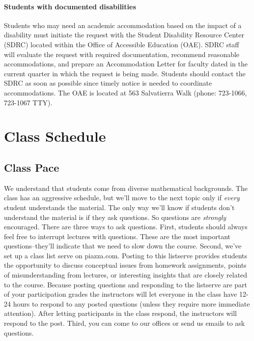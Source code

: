 \documentclass[11pt,letterpaper]{article}
\numberwithin{equation}{section}
\begin{document}
\paragraph{Students with documented disabilities} Students who may need an academic accommodation based on the impact of a disability must initiate the request with the Student Disability Resource Center (SDRC) located within the Office of Accessible Education (OAE). SDRC staff will evaluate the request with required documentation, recommend reasonable accommodations, and prepare an Accommodation Letter for faculty dated in the current quarter in which the request is being made. Students should contact the SDRC as soon as possible since timely notice is needed to coordinate accommodations. The OAE is located at 563 Salvatierra Walk (phone: 723-1066, 723-1067 TTY).

\section*{Class Schedule}

\subsection*{Class Pace} We understand that students come from diverse mathematical backgrounds.  The class has an aggressive schedule, but we'll move to the next topic only if \emph{every} student understands the material.  The only way we'll know if students don't understand the material is if they ask questions.  So questions are \emph{strongly} encouraged.  There are three ways to ask questions.  First, students should always feel free to interrupt lectures with questions. These are the most important questions--they'll indicate that we need to slow down the course.  Second, we've set up a class list serve on piazza.com.  Posting to this listserve provides students the opportunity to discuss conceptual issues from homework assignments, points of misunderstanding from lectures, or interesting insights that are closely related to the course.  Because posting questions and responding to the listserve are part of your participation grades the instructors will let everyone in the class have 12-24 hours to respond to any posted questions (unless they require more immediate attention).  After letting participants in the class respond, the instructors will respond to the post.  Third, you can come to our offices or send us emails to ask questions.       \\
\end{document}
